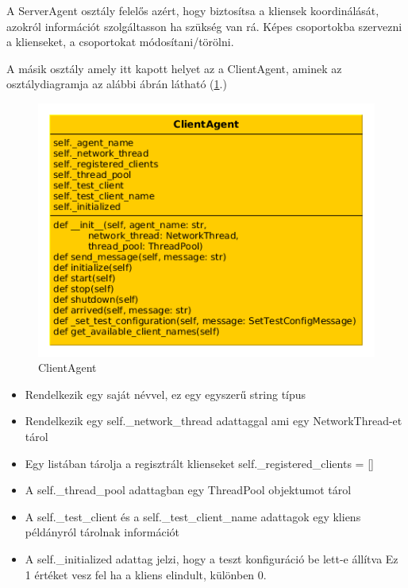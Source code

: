 \documentclass[a4paper,12pt,oneside]{report}
\begin{document}
A ServerAgent osztály felelős azért, hogy biztosítsa a kliensek koordinálását, azokról információt szolgáltasson ha szükség van rá.
Képes csoportokba szervezni a klienseket, a csoportokat módosítani/törölni.

A másik osztály amely itt kapott helyet az a ClientAgent, aminek az osztálydiagramja az alábbi ábrán látható (\ref{fig:clientagent_class}.)

	\begin{figure}[h]
	  \includegraphics[width=13cm, keepaspectratio]{clientagent_class.png}
	  \caption{ClientAgent}
	  \label{fig:clientagent_class}
	\end{figure}
	
\begin{itemize}
	\itemsep0em
		\item Rendelkezik egy saját névvel, ez egy egyszerű string típus
		\item Rendelkezik egy self.\_network\_thread adattaggal ami egy NetworkThread-et tárol
		\item Egy listában tárolja a regisztrált klienseket self.\_registered\_clients = []
		\item A self.\_thread\_pool adattagban egy ThreadPool objektumot tárol
		\item A self.\_test\_client és a self.\_test\_client\_name adattagok egy kliens példányról tárolnak információt
 		\item  A self.\_initialized adattag jelzi, hogy a teszt konfiguráció be lett-e állítva
 		Ez 1 értéket vesz fel ha a kliens elindult, különben 0.
\end{itemize}
	
\end{document}
